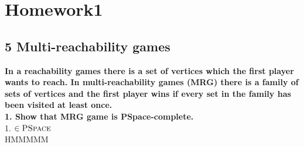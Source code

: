 \section{Homework1}
\subsection*{5 Multi-reachability games}
\textbf{In a reachability games there is a set of vertices which the first player
wants to reach. In multi-reachability games (MRG) there is a family of
sets of vertices and the first player wins if every set in the family has been
visited at least once.\\
1. Show that MRG game is PSpace-complete.}\\
1. \underline{$\in \textsc{PSpace}$}\\
HMMMMM


